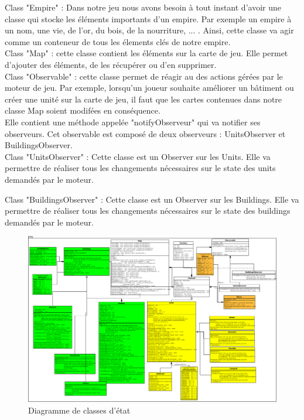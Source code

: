 \documentclass[12pt,a4paper]{article}
\begin{document}
Class "Empire" : Dans notre jeu nous avons besoin à tout instant d'avoir une classe qui stocke les éléments importants d'un empire. Par exemple un empire à un nom, une vie, de l'or, du bois, de la nourriture, ... . Ainsi, cette classe va agir comme un conteneur de tous les élements clés de notre empire.\\

Class "Map" : cette classe contient les éléments sur la carte de jeu. Elle permet d'ajouter des éléments, de les récupérer ou d'en supprimer.\\

Class "Observable" : cette classe permet de réagir au des actions gérées par le moteur de jeu. Par exemple, lorsqu'un joueur souhaite améliorer un bâtiment ou créer une unité sur la carte de jeu, il faut que les cartes contenues dans notre classe Map soient modifées en conséquence.\\ Elle contient une méthode appelée "notifyObserveur" qui va notifier ses observeurs. Cet observable est composé de deux observeurs : UnitsObserver et BuildingsObserver.\\

Class "UnitsObserver" : Cette classe est un Observer sur les Units. Elle va permettre de réaliser tous les changements nécessaires sur le state des units demandés par le moteur.

Class "BuildingsObserver" : Cette classe est un Observer sur les Buildings. Elle va permettre de réaliser tous les changements nécessaires sur le state des buildings demandés par le moteur.

\begin{figure}[!ht]
\centering
    \includegraphics[width=1\textwidth]{ressources/state.png}
     \caption{Diagramme de classes d'état}
\end{figure}
\end{document}
